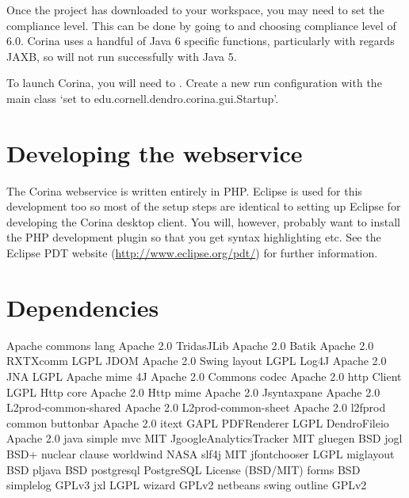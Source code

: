 Once the project has downloaded to your workspace, you may need to set the compliance level.  This can be done by going to  and choosing compliance level of 6.0.  Corina uses a handful of Java 6 specific functions, particularly with regards JAXB, so will not run successfully with Java 5.

To launch Corina, you will need to .  Create a new run configuration with the main class `set to edu.cornell.dendro.corina.gui.Startup'.     


\section{Developing the webservice}
The Corina webservice is written entirely in PHP.  Eclipse is used for this development too so most of the setup steps are identical to setting up Eclipse for developing the Corina desktop client.  You will, however, probably want to install the PHP development plugin so that you get syntax highlighting etc.  See the Eclipse PDT website (\url{http://www.eclipse.org/pdt/}) for further information.



\section{Dependencies}
Apache commons lang	Apache 2.0
TridasJLib	Apache 2.0
Batik	Apache 2.0
RXTXcomm	LGPL
JDOM	Apache 2.0
Swing layout	LGPL
Log4J	Apache 2.0
JNA	LGPL
Apache mime 4J	Apache 2.0
Commons codec	Apache 2.0
http Client	LGPL
Http core	Apache 2.0
Http mime	Apache 2.0
Jsyntaxpane	Apache 2.0
L2prod-common-shared	Apache 2.0
L2prod-common-sheet	Apache 2.0
l2fprod common buttonbar	Apache 2.0
itext	GAPL
PDFRenderer	LGPL
DendroFileio	Apache 2.0
java simple mvc	MIT
JgoogleAnalyticsTracker	MIT
gluegen	BSD
jogl	BSD+ nuclear clause
worldwind	NASA 
slf4j	MIT
jfontchooser	LGPL
miglayout	BSD
pljava	BSD
postgresql	PostgreSQL License (BSD/MIT)
forms	BSD
simplelog	GPLv3
jxl	LGPL
wizard	GPLv2
netbeans swing outline	GPLv2

